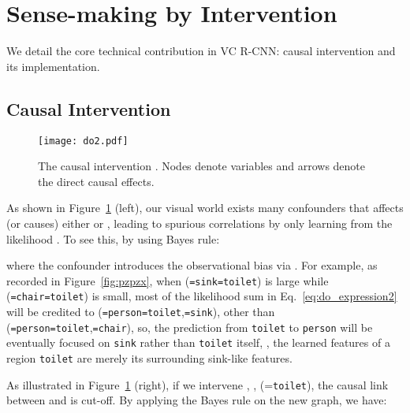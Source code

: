 \documentclass[10pt,twocolumn,letterpaper]{article}
\begin{document}
 
\section{Sense-making by Intervention}
We detail the core technical contribution in VC R-CNN: causal intervention and its implementation.







\subsection{Causal Intervention}
\label{sec:causal_intervention}
\begin{figure}[htbp]
\vspace{-0.4em}
\begin{minipage}[c]{0.55\linewidth}
\texttt{[image: do2.pdf]}
\end{minipage}\hfill
\begin{minipage}[c]{0.4\linewidth}
\caption{\footnotesize The causal intervention . Nodes denote variables and arrows denote the direct causal effects.}
\label{fig:do}
\end{minipage}\vspace{-3mm}
\end{figure}



As shown in Figure~\ref{fig:do} (left), our visual world exists many confounders  that affects (or causes) either  or , leading to spurious correlations by only learning from the likelihood . To see this, by using Bayes rule:

where the confounder  introduces the observational bias via . For example, as recorded in Figure~\ref{fig:pzpzx}, when (\texttt{=sink}\texttt{=toilet}) is large while (\texttt{=chair}\texttt{=toilet}) is small, most of the likelihood sum in Eq.~\eqref{eq:do_expression2} will be credited to (\texttt{=person}\texttt{=toilet},\texttt{=sink}), other than (\texttt{=person}\texttt{=toilet},\texttt{=chair}), so, the prediction from \texttt{toilet} to \texttt{person} will be eventually focused on \texttt{sink} rather than \texttt{toilet} itself, \eg, the learned features of a region \texttt{toilet} are merely its surrounding sink-like features. 


As illustrated in Figure~\ref{fig:do} (right), if we intervene , \eg, (=\texttt{toilet}), the causal link between  and  is cut-off. By applying the Bayes rule on the new graph, we have:
\vspace{-0.2cm}
\end{document}
